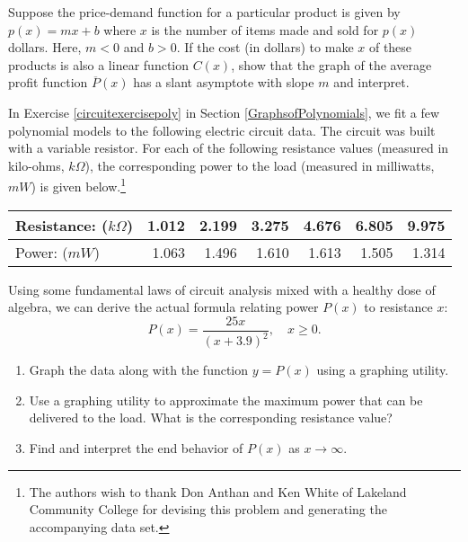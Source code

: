 \documentclass{ximera}
\begin{document}
\begin{problem}\label{slantyintaverageprofitexercise}
Suppose the price-demand function for a particular product is given by $p(x) = mx + b$  where $x$ is the number of items made and sold for $p(x)$ dollars.  Here,  $m<0$ and $b>0$.  If the cost (in dollars) to make $x$ of these products is also a linear  function $C(x)$, show that the graph of the average profit function $\overline{P}(x)$ has a slant asymptote with slope $m$ and interpret.
\end{problem}

\begin{problem}
In Exercise \ref{circuitexercisepoly} in Section \ref{GraphsofPolynomials}, we fit a few polynomial models to the following electric circuit data. The circuit was built with a variable resistor.  For each of the following resistance values (measured in kilo-ohms, $k \Omega$),  the corresponding power to the load (measured in milliwatts, $mW$) is given below.\footnote{The authors wish to thank Don Anthan and Ken White of Lakeland Community College for devising this problem and generating the accompanying data set.}

\begin{tabular}{|l|r|r|r|r|r|r|} \hline
Resistance: ($k \Omega$) & 1.012 & 2.199 & 3.275 & 4.676 & 6.805 & 9.975 \\ \hline
Power: ($mW$) & 1.063 & 1.496 & 1.610 & 1.613 & 1.505 & 1.314 \\ \hline
\end{tabular}

\noindent Using some fundamental laws of circuit analysis mixed with a healthy dose of algebra, we can derive the actual formula relating power $P(x)$ to resistance $x$:   \[P(x) = \frac{25x}{(x + 3.9)^2}, \quad x \geq 0.\]

\begin{enumerate}

\item Graph the data along with the function $y = P(x)$ using a graphing utility.

\item Use a graphing utility to approximate the maximum power that can be delivered to the load.  What is the corresponding resistance value?

\item Find and interpret the end behavior of $P(x)$ as $x \rightarrow \infty$.

\end{enumerate}
\end{problem}
\end{document}
